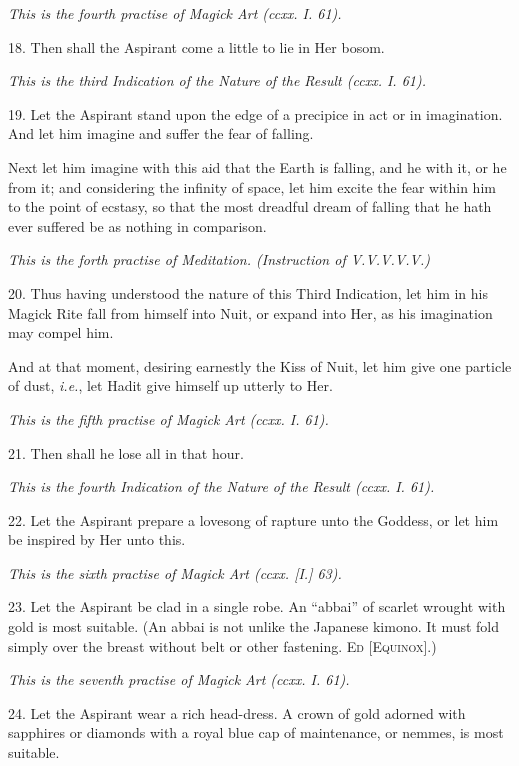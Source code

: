 \textit{This is the fourth practise of Magick Art (ccxx. I. 61).}

18. Then shall the Aspirant come a little to lie in Her bosom.

\textit{This is the third Indication of the Nature of the Result (ccxx. I. 61).}

19. Let the Aspirant stand upon the edge of a precipice in act or in imagination. And let him imagine and suffer the fear of falling.

Next let him imagine with this aid that the Earth is falling, and he with it, or he from it; and considering the infinity of space, let him excite the fear within him to the point of ecstasy, so that the most dreadful dream of falling that he hath ever suffered be as nothing in comparison.

\textit{This is the forth practise of Meditation. (Instruction of V.V.V.V.V.)}

20. Thus having understood the nature of this Third Indication, let him in his Magick Rite fall from himself into Nuit, or expand into Her, as his imagination may compel him.

And at that moment, desiring earnestly the Kiss of Nuit, let him give one particle of dust, \textit{i.e.}, let Hadit give himself up utterly to Her.

\textit{This is the fifth practise of Magick Art (ccxx. I. 61).}

21. Then shall he lose all in that hour.

\textit{This is the fourth Indication of the Nature of the Result (ccxx. I. 61).}

22. Let the Aspirant prepare a lovesong of rapture unto the Goddess, or let him be inspired by Her unto this.

\textit{This is the sixth practise of Magick Art (ccxx. [I.] 63).}

23. Let the Aspirant be clad in a single robe. An \enquote{abbai} of scarlet wrought with gold is most suitable. (An abbai is not unlike the Japanese kimono. It must fold simply over the breast without belt or other fastening. \textsc{Ed [Equinox]}.)

\textit{This is the seventh practise of Magick Art (ccxx. I. 61).}

24. Let the Aspirant wear a rich head-dress. A crown of gold adorned with sapphires or diamonds with a royal blue cap of maintenance, or nemmes, is most suitable.

